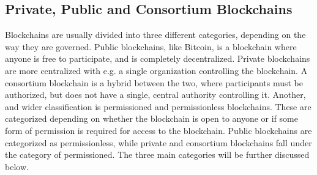 






\subsection{Private, Public and Consortium Blockchains}
Blockchains are usually divided into three different categories, depending on the way they are governed. \cite{Ethereum_pub_priv} %
Public blockchains, like Bitcoin, is a blockchain where anyone is free to participate, and is completely decentralized. Private blockchains are more centralized with e.g. a single organization controlling the blockchain. A consortium blockchain is a hybrid between the two, where participants must be authorized, but does not have a single, central authority controlling it. Another, and wider classification is permissioned and permissionless blockchains. These are categorized depending on whether the blockchain is open to anyone or if some form of permission is required for access to the blockchain. Public blockchains are categorized as permissionless, while private and consortium blockchains fall under the category of permissioned. The three main categories will be further discussed below.


